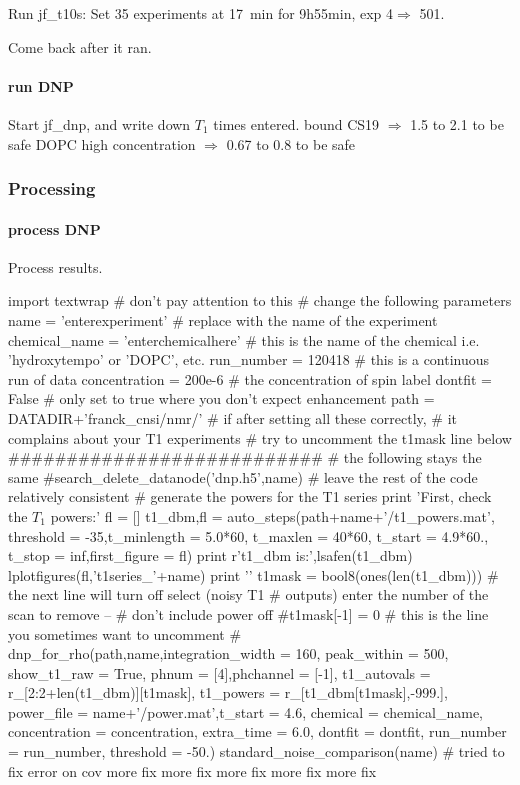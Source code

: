 Run jf\_t10s:
Set 35 experiments at 17~min for 9h55min, exp 4$\Rightarrow$ 501.

Come back after it ran.

\paragraph{run DNP}
Start jf\_dnp, and write down $T_1$ times entered.
bound CS19 $\Rightarrow$ 1.5 to 2.1 to be safe
DOPC high concentration $\Rightarrow$ 0.67 to 0.8 to be safe

\subsubsection{Processing}

\paragraph{process DNP}
Process results.


\begin{scriptsize}
\begin{python}[off]
import textwrap # don't pay attention to this
# change the following parameters
name = 'enterexperiment' # replace with the name of the experiment
chemical_name = 'enterchemicalhere' # this is the name of the chemical i.e. 'hydroxytempo' or 'DOPC', etc.
run_number = 120418 # this is a continuous run of data
concentration = 200e-6 # the concentration of spin label
dontfit = False # only set to true where you don't expect enhancement
path = DATADIR+'franck_cnsi/nmr/'
# if after setting all these correctly,
# it complains about your T1 experiments
# try to uncomment the t1mask line below
###########################
# the following stays the same
#search_delete_datanode('dnp.h5',name)
# leave the rest of the code relatively consistent
#{{{ generate the powers for the T1 series
print 'First, check the $T_1$ powers:\n\n'
fl = []
t1_dbm,fl = auto_steps(path+name+'/t1_powers.mat',
    threshold = -35,t_minlength = 5.0*60,
    t_maxlen = 40*60, t_start = 4.9*60.,
    t_stop = inf,first_figure = fl)
print r't1\_dbm is:',lsafen(t1_dbm)
lplotfigures(fl,'t1series_'+name)
print '\n\n'
t1mask = bool8(ones(len(t1_dbm)))
# the next line will turn off select (noisy T1
# outputs) enter the number of the scan to remove --
# don't include power off
#t1mask[-1] = 0 # this is the line you sometimes want to uncomment
#}}}
dnp_for_rho(path,name,integration_width = 160,
        peak_within = 500, show_t1_raw = True,
        phnum = [4],phchannel = [-1],
        t1_autovals = r_[2:2+len(t1_dbm)][t1mask],
        t1_powers = r_[t1_dbm[t1mask],-999.],
        power_file = name+'/power.mat',t_start = 4.6,
        chemical = chemical_name,
        concentration = concentration,
        extra_time = 6.0,
        dontfit = dontfit,
        run_number = run_number,
        threshold = -50.)
standard_noise_comparison(name)
# tried to fix error on cov more fix more fix more fix more fix more fix
\end{python}
\end{scriptsize}

